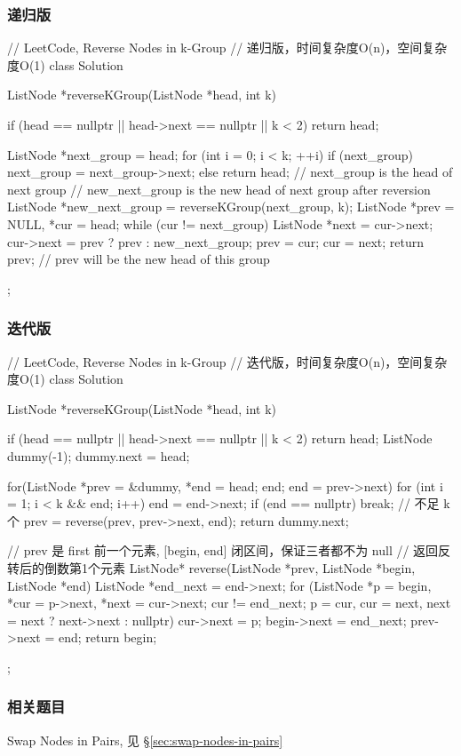 \subsubsection{递归版}
\begin{Code}
	// LeetCode, Reverse Nodes in k-Group
	// 递归版，时间复杂度O(n)，空间复杂度O(1)
	class Solution {
		ListNode *reverseKGroup(ListNode *head, int k) {
			if (head == nullptr || head->next == nullptr || k < 2)
				return head;
			
			ListNode *next_group = head;
			for (int i = 0; i < k; ++i) {
				if (next_group)
					next_group = next_group->next;
				else
					return head;
			}
			// next_group is the head of next group
			// new_next_group is the new head of next group after reversion
			ListNode *new_next_group = reverseKGroup(next_group, k);
			ListNode *prev = NULL, *cur = head;
			while (cur != next_group) {
				ListNode *next = cur->next;
				cur->next = prev ? prev : new_next_group;
				prev = cur;
				cur = next;
			}
			return prev; // prev will be the new head of this group
		}
	};
\end{Code}


\subsubsection{迭代版}
\begin{Code}
	// LeetCode, Reverse Nodes in k-Group
	// 迭代版，时间复杂度O(n)，空间复杂度O(1)
	class Solution {
		ListNode *reverseKGroup(ListNode *head, int k) {
			if (head == nullptr || head->next == nullptr || k < 2) return head;
			ListNode dummy(-1);
			dummy.next = head;
			
			for(ListNode *prev = &dummy, *end = head; end; end = prev->next) {
				for (int i = 1; i < k && end; i++)
					end = end->next;
				if (end  == nullptr) break;  // 不足 k 个
				prev = reverse(prev, prev->next, end);
			}
			return dummy.next;
		}
		
		// prev 是 first 前一个元素, [begin, end] 闭区间，保证三者都不为 null
		// 返回反转后的倒数第1个元素
		ListNode* reverse(ListNode *prev, ListNode *begin, ListNode *end) {
			ListNode *end_next = end->next;
			for (ListNode *p = begin, *cur = p->next, *next = cur->next; cur != end_next;
				p = cur, cur = next, next = next ? next->next : nullptr) {
				cur->next = p;
			}
			begin->next = end_next;
			prev->next = end;
			return begin;
		}
	};
\end{Code}


\subsubsection{相关题目}
\begindot
\item Swap Nodes in Pairs, 见 \S \ref{sec:swap-nodes-in-pairs}
\myenddot


